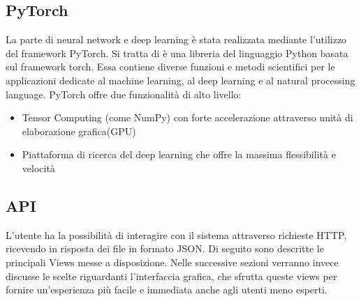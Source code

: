 \documentclass{article}
\begin{document}
\subsection{PyTorch}
La parte di neural network e deep learning è stata realizzata mediante l'utilizzo del framework PyTorch. Si tratta di è una libreria del linguaggio Python basata sul framework torch.
Essa contiene diverse funzioni e metodi scientifici per le applicazioni dedicate al machine learning, al deep learning e al natural processing language.
PyTorch offre  due funzionalità di alto livello:
\begin{itemize}
\item Tensor Computing (come NumPy) con forte accelerazione attraverso unità di elaborazione grafica(GPU)
\item Piattaforma di ricerca del deep learning che offre la massima flessibilità e velocità
\end{itemize}

\subsection{API}
L'utente ha la possibilità di interagire con il sistema attraverso richieste HTTP, ricevendo in risposta dei file in formato JSON. Di seguito sono descritte le principali Views messe a disposizione. Nelle successive sezioni verranno invece discusse le scelte riguardanti l'interfaccia grafica, che sfrutta queste views per fornire un'esperienza più facile e immediata anche agli utenti meno esperti.
\end{document}
